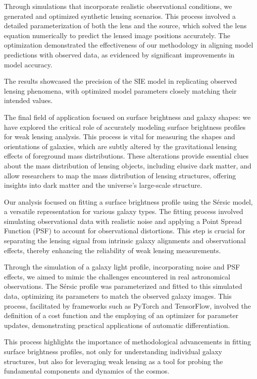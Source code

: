 Through simulations that incorporate realistic observational conditions, we generated and optimized synthetic lensing scenarios. This process involved a detailed parameterization of both the lens and the source, which solved the lens equation numerically to predict the lensed image positions accurately. The optimization demonstrated the effectiveness of our methodology in aligning model predictions with observed data, as evidenced by significant improvements in model accuracy.

The results showcased the precision of the SIE model in replicating observed lensing phenomena, with optimized model parameters closely matching their intended values.

The final field of application focused on surface brightness and galaxy shapes: we have explored the critical role of accurately modeling surface brightness profiles for weak lensing analysis. This process is vital for measuring the shapes and orientations of galaxies, which are subtly altered by the gravitational lensing effects of foreground mass distributions. These alterations provide essential clues about the mass distribution of lensing objects, including elusive dark matter, and allow researchers to map the mass distribution of lensing structures, offering insights into dark matter and the universe's large-scale structure.

Our analysis focused on fitting a surface brightness profile using the Sérsic model, a versatile representation for various galaxy types. The fitting process involved simulating observational data with realistic noise and applying a Point Spread Function (PSF) to account for observational distortions. This step is crucial for separating the lensing signal from intrinsic galaxy alignments and observational effects, thereby enhancing the reliability of weak lensing measurements.

Through the simulation of a galaxy light profile, incorporating noise and PSF effects, we aimed to mimic the challenges encountered in real astronomical observations. The Sérsic profile was parameterized and fitted to this simulated data, optimizing its parameters to match the observed galaxy images. This process, facilitated by frameworks such as PyTorch and TensorFlow, involved the definition of a cost function and the employing of an optimizer for parameter updates, demonstrating practical applications of automatic differentiation.

This process highlights the importance of methodological advancements in fitting surface brightness profiles, not only for understanding individual galaxy structures, but also for leveraging weak lensing as a tool for probing the fundamental components and dynamics of the cosmos.

